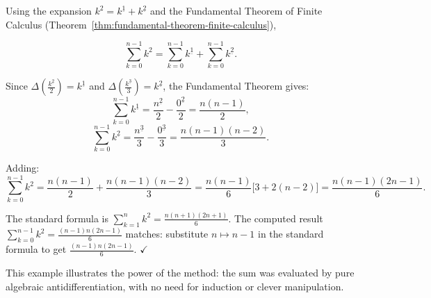 \begin{example*}
Using the expansion \(k^2 = k^{\underline{1}} + k^{\underline{2}}\) and the
Fundamental Theorem of Finite Calculus (Theorem~\ref{thm:fundamental-theorem-finite-calculus}),

\[
\sum_{k=0}^{n-1} k^2
= \sum_{k=0}^{n-1} k^{\underline{1}} + \sum_{k=0}^{n-1} k^{\underline{2}}.
\]

Since \(\Delta\!\left(\tfrac{k^{\underline{2}}}{2}\right) = k^{\underline{1}}\) and
\(\Delta\!\left(\tfrac{k^{\underline{3}}}{3}\right) = k^{\underline{2}}\),
the Fundamental Theorem gives:
\[
\sum_{k=0}^{n-1} k^{\underline{1}}
= \frac{n^{\underline{2}}}{2} - \frac{0^{\underline{2}}}{2}
= \frac{n(n-1)}{2},
\]
\[
\sum_{k=0}^{n-1} k^{\underline{2}}
= \frac{n^{\underline{3}}}{3} - \frac{0^{\underline{3}}}{3}
= \frac{n(n-1)(n-2)}{3}.
\]

Adding:
\[
\sum_{k=0}^{n-1} k^2
= \frac{n(n-1)}{2} + \frac{n(n-1)(n-2)}{3}
= \frac{n(n-1)}{6}\bigl[3 + 2(n-2)\bigr]
= \frac{n(n-1)(2n-1)}{6}.
\]
\end{example*}

\begin{remark*}[Interpretation]
The standard formula is \(\displaystyle\sum_{k=1}^{n} k^2 = \tfrac{n(n+1)(2n+1)}{6}\).
The computed result \(\displaystyle\sum_{k=0}^{n-1} k^2 = \tfrac{(n-1)n(2n-1)}{6}\) matches:
substitute \(n \mapsto n-1\) in the standard formula to get
\(\tfrac{(n-1)n(2n-1)}{6}\). \(\checkmark\)

This example illustrates the power of the method: the sum was evaluated
by pure algebraic antidifferentiation, with no need for induction or
clever manipulation.
\end{remark*}
